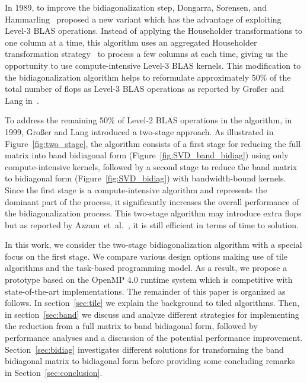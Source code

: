 In 1989, to improve the bidiagonalization step,
Dongarra, Sorensen, and Hammarling~\cite{dongarra1989block}
proposed a new variant which has the advantage of exploiting
Level-3 BLAS operations.
Instead of applying the Householder transformations to
one column at a time,
this algorithm uses an aggregated Householder transformation
strategy~\cite{bischof1987wy} to process a few columns at each time,
giving us the opportunity to use compute-intensive Level-3 BLAS kernels.
This modification to the bidiagonalization algorithm helps
to reformulate approximately 50\% of the total number of flops as Level-3 BLAS operations
as reported by Gro{\ss}er and Lang in~\cite{grosser1999efficient}.

To address the remaining 50\% of Level-2 BLAS operations in the
algorithm, in 1999, Gro{\ss}er and Lang introduced a two-stage
approach.
As illustrated in Figure~\ref{fig:two_stage}, the algorithm consists of
a first stage for reducing the full matrix into
band bidiagonal form (Figure~\ref{fig:SVD_band_bidiag}) using only
compute-intensive kernels,
followed by a second stage to reduce the band
matrix to bidiagonal form (Figure~\ref{fig:SVD_bidiag}) with
bandwidth-bound kernels.
Since the first stage is a compute-intensive
algorithm and represents the dominant part of the process,
it significantly increases the overall performance of the
bidiagonalization process.
This two-stage algorithm may introduce extra flops
but as reported by Azzam~et~al\@.~\cite{haidar2013improved},
it is still efficient in terms of time to solution.

In this work, we consider the two-stage bidiagonalization algorithm
with a special focus on the first stage.
We compare various design options making use of tile algorithms and
the task-based programming model.
As a result,
we propose a prototype based on the OpenMP 4.0 runtime system which is
competitive with state-of-the-art implementations.
The remainder of this paper is organized as follows.
In section~\ref{sec:tile} we explain the background to tiled algorithms.
Then, in section~\ref{sec:band} we discuss and analyze
different strategies for implementing the
reduction from a full matrix to band bidiagonal form,
followed by performance analyses and a discussion of
the potential performance improvement.
Section~\ref{sec:bidiag} investigates different solutions
for transforming the band bidiagonal matrix
to bidiagonal form before providing some concluding
remarks in Section~\ref{sec:conclusion}.

